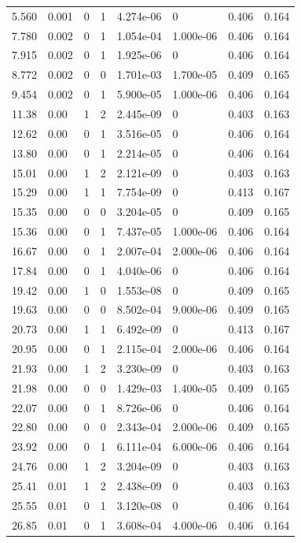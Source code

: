 \documentclass[preview]{standalone}
\begin{document}
{{\begin{tabular}{L{1.2cm}C{1.2cm} C{0.3cm}C{0.5cm} C{1.4cm}C{1.4cm} C{1.4cm}C{1.4cm}}
  5.560  &  0.001  & 0     &  1 &  4.274e-06  & 0  & 0.406 &  0.164   \\ 
  7.780  &  0.002  & 0     &  1 &  1.054e-04  & 1.000e-06  & 0.406 &  0.164   \\ 
  7.915  &  0.002  & 0     &  1 &  1.925e-06  & 0  & 0.406 &  0.164   \\ 
  8.772  &  0.002  & 0     &  0 &  1.701e-03  & 1.700e-05  & 0.409 &  0.165   \\ 
  9.454  &  0.002  & 0     &  1 &  5.900e-05  & 1.000e-06  & 0.406 &  0.164   \\ 
  11.38  &  0.00  & 1     &  2 &  2.445e-09  & 0  & 0.403 &  0.163   \\ 
  12.62  &  0.00  & 0     &  1 &  3.516e-05  & 0  & 0.406 &  0.164   \\ 
  13.80  &  0.00  & 0     &  1 &  2.214e-05  & 0  & 0.406 &  0.164   \\ 
  15.01  &  0.00  & 1     &  2 &  2.121e-09  & 0  & 0.403 &  0.163   \\ 
  15.29  &  0.00  & 1     &  1 &  7.754e-09  & 0  & 0.413 &  0.167   \\ 
  15.35  &  0.00  & 0     &  0 &  3.204e-05  & 0  & 0.409 &  0.165   \\ 
  15.36  &  0.00  & 0     &  1 &  7.437e-05  & 1.000e-06  & 0.406 &  0.164   \\ 
  16.67  &  0.00  & 0     &  1 &  2.007e-04  & 2.000e-06  & 0.406 &  0.164   \\ 
  17.84  &  0.00  & 0     &  1 &  4.040e-06  & 0  & 0.406 &  0.164   \\ 
  19.42  &  0.00  & 1     &  0 &  1.553e-08  & 0  & 0.409 &  0.165   \\ 
  19.63  &  0.00  & 0     &  0 &  8.502e-04  & 9.000e-06  & 0.409 &  0.165   \\ 
  20.73  &  0.00  & 1     &  1 &  6.492e-09  & 0  & 0.413 &  0.167   \\ 
  20.95  &  0.00  & 0     &  1 &  2.115e-04  & 2.000e-06  & 0.406 &  0.164   \\ 
  21.93  &  0.00  & 1     &  2 &  3.230e-09  & 0  & 0.403 &  0.163   \\ 
  21.98  &  0.00  & 0     &  0 &  1.429e-03  & 1.400e-05  & 0.409 &  0.165   \\ 
  22.07  &  0.00  & 0     &  1 &  8.726e-06  & 0  & 0.406 &  0.164   \\ 
  22.80  &  0.00  & 0     &  0 &  2.343e-04  & 2.000e-06  & 0.409 &  0.165   \\ 
  23.92  &  0.00  & 0     &  1 &  6.111e-04  & 6.000e-06  & 0.406 &  0.164   \\ 
  24.76  &  0.00  & 1     &  2 &  3.204e-09  & 0  & 0.403 &  0.163   \\ 
  25.41  &  0.01  & 1     &  2 &  2.438e-09  & 0  & 0.403 &  0.163   \\ 
  25.55  &  0.01  & 0     &  1 &  3.120e-08  & 0  & 0.406 &  0.164   \\ 
  26.85  &  0.01  & 0     &  1 &  3.608e-04  & 4.000e-06  & 0.406 &  0.164   \\ 
\hline 
\end{tabular} 

}}
\end{document}
